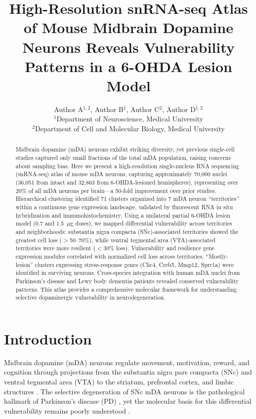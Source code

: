\documentclass[11pt]{article}
\title{High-Resolution snRNA-seq Atlas of Mouse Midbrain Dopamine Neurons Reveals Vulnerability Patterns in a 6-OHDA Lesion Model}
\author{Author A$^{1,2}$, Author B$^{1}$, Author C$^{2}$, Author D$^{1,2}$ \\
\small $^{1}$Department of Neuroscience, Medical University \\
\small $^{2}$Department of Cell and Molecular Biology, Medical University}
\date{}
\begin{document}
\maketitle

\begin{abstract}
Midbrain dopamine (mDA) neurons exhibit striking diversity, yet previous single-cell studies captured only small fractions of the total mDA population, raising concerns about sampling bias. Here we present a high-resolution single-nucleus RNA sequencing (snRNA-seq) atlas of mouse mDA neurons, capturing approximately 70,000 nuclei (36,051 from intact and 32,863 from 6-OHDA-lesioned hemispheres), representing over 20\% of all mDA neurons per brain---a 50-fold improvement over prior studies. Hierarchical clustering identified 71 clusters organized into 7 mDA neuron ``territories'' within a continuous gene expression landscape, validated by fluorescent RNA in situ hybridization and immunohistochemistry. Using a unilateral partial 6-OHDA lesion model (0.7 and 1.5~$\mu$g doses), we mapped differential vulnerability across territories and neighborhoods: substantia nigra compacta (SNc)-associated territories showed the greatest cell loss ($>$50--70\%), while ventral tegmental area (VTA)-associated territories were more resilient ($<$30\% loss). Vulnerability and resilience gene expression modules correlated with normalized cell loss across territories. ``Mostly-lesion'' clusters expressing stress-response genes (Clic4, Creb5, Mmp12, Sprr1a) were identified in surviving neurons. Cross-species integration with human mDA nuclei from Parkinson's disease and Lewy body dementia patients revealed conserved vulnerability patterns. This atlas provides a comprehensive molecular framework for understanding selective dopaminergic vulnerability in neurodegeneration.
\end{abstract}

\section{Introduction}

Midbrain dopamine (mDA) neurons regulate movement, motivation, reward, and cognition through projections from the substantia nigra pars compacta (SNc) and ventral tegmental area (VTA) to the striatum, prefrontal cortex, and limbic structures \citep{gerfen2011handbook}. The selective degeneration of SNc mDA neurons is the pathological hallmark of Parkinson's disease (PD) \citep{parkinson_disease2017, damier1999substantia}, yet the molecular basis for this differential vulnerability remains poorly understood \citep{surmeier2017selective, brichta2013molecular}.
\end{document}
